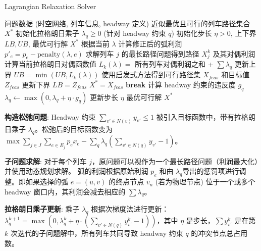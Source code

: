 \documentclass{article}
\begin{document}
    \begin{algorithm}[h]
        \caption{Lagrangian Relaxation Solver}
        \begin{algorithmic}[1]
            \Require 问题数据 (时空网络, 列车信息, headway 定义)
            \Ensure 近似最优且可行的列车路径集合 $X^*$
            \State 初始化拉格朗日乘子 $\lambda_q \ge 0$ (针对 headway 约束 $q$)
            \State 初始化步长 $\eta > 0$, 上下界 $LB, UB$, 最优可行解 $X^*$
                    \State 根据当前 $\lambda$ 计算修正后的弧利润 $p'_e = p_e -
                    \text{penalty}(\lambda, e)$
                    \State 求解列车 $j$ 的最长路径问题得到路径 $X^k_j$ 及其对偶利润
                \EndFor
                \State 计算当前拉格朗日对偶函数值 $L_k(\lambda) = $ 所有列车对偶利润之和 + $\sum \lambda_q$
                \State 更新上界 $UB = \min(UB, L_k(\lambda))$
                \State 使用启发式方法得到可行路径集 $X_{feas}$
                和目标值 $Z_{feas}$
                    \State 更新下界 $LB = Z_{feas}$
                    \State $X^* = X_{feas}$
                \EndIf
                    \State \textbf{break}
                \EndIf
                \State 计算 headway 约束的违反度 $g_q$
                \State $\lambda_q \gets \max(0, \lambda_q + \eta \cdot g_q)$
                \State 更新步长 $\eta$
            \EndFor
            \State \Return 最优可行解 $X^*$
        \end{algorithmic}\label{alg:lagrangian_relaxation}
    \end{algorithm}

    \textbf{构造松弛问题}:
    Headway 约束 $\sum_{v' \in N(v)} y_{v'} \le 1$
    被引入目标函数中，带有拉格朗日乘子 $\lambda_q$。松弛后的目标函数变为 $\max
    \sum_{j \in J} \sum_{e \in E_j} p_e x_e - \sum_q \lambda_q
    (\sum_{v' \in N(q)} y_{v'} - 1)$。

    \textbf{子问题求解}:
    对于每个列车 $j$，原问题可以视作为一个最长路径问题（利润最大化）并使用动态规划求解。 弧的利润根据原始利润 $p_e$ 和由
    $\lambda_q$导出的惩罚项进行调整。即如果选择的弧 $e=(u,v)$ 的终点节点 $v_n$ (若为物理节点)
    位于一个或多个 headway 窗口内，其利润会减去相应的 $\sum \lambda_q$。

    \textbf{拉格朗日乘子更新}:
    乘子 $\lambda_q$ 根据次梯度法进行更新： $\lambda_q^{k+1} =
    \max(0, \lambda_q^k + \eta \cdot (\sum_{v' \in N(q)}
    y_{v'}^{k} - 1))$，其中 $\eta$ 是步长，$\sum
    y_{v'}^{k}$ 是在第 $k$ 次迭代的子问题解中，所有列车共同导致 headway 约束 $q$
    的冲突节点总占用数。
\end{document}

